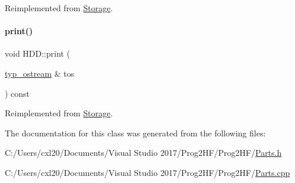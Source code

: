 Reimplemented from \mbox{\hyperlink{class_storage_a53fc5b4814df41517b9f2be8dcef605e}{Storage}}.

\mbox{\label{class_h_d_d_a557271f835f56a25fe5c264019f20bb2}} 
\paragraph{\texorpdfstring{print()}{print()}\hspace{0.1cm}{\footnotesize\ttfamily [4/4]}}
{\footnotesize\ttfamily void H\+D\+D\+::print (\begin{DoxyParamCaption}\item[{\mbox{\hyperlink{structtyp__ostream}{typ\+\_\+ostream}} \&}]{tos }\end{DoxyParamCaption}) const\hspace{0.3cm}{\ttfamily [virtual]}}



Reimplemented from \mbox{\hyperlink{class_storage_ad6c13f251a39612a7628980bf2f12918}{Storage}}.



The documentation for this class was generated from the following files\+:\begin{DoxyCompactItemize}
\item 
C\+:/\+Users/cxl20/\+Documents/\+Visual Studio 2017/\+Prog2\+H\+F/\+Prog2\+H\+F/\mbox{\hyperlink{_parts_8h}{Parts.\+h}}\item 
C\+:/\+Users/cxl20/\+Documents/\+Visual Studio 2017/\+Prog2\+H\+F/\+Prog2\+H\+F/\mbox{\hyperlink{_parts_8cpp}{Parts.\+cpp}}\end{DoxyCompactItemize}

